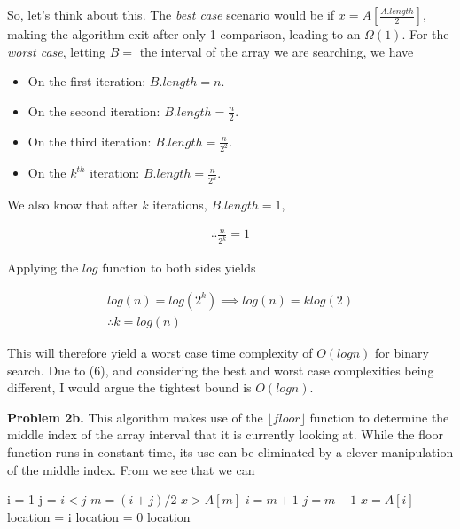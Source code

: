 \documentclass{article}
\begin{document}
So, let's think about this. The \emph{best case} scenario would be if $x = A[\frac{A.length}{2}]$, making the algorithm exit after only 1 comparison, leading to an $\Omega(1)$. For the \emph{worst case}, letting $B =$ the interval of the array we are searching, we have

\begin{itemize}
    \item On the first iteration: $B.length = n$.
    \item On the second iteration: $B.length = \frac{n}{2}$.
    \item On the third iteration: $B.length = \frac{n}{2^2}$.
    \item On the $k^{th}$ iteration: $B.length = \frac{n}{2^k}$.
\end{itemize}

We also know that after $k$ iterations, $B.length = 1$,

\begin{gather}
    \therefore \frac{n}{2^k} = 1
\end{gather}

Applying the $log$ function to both sides yields

\begin{gather}
    log(n) = log(2^k) \implies log(n) = klog(2) \\
    \therefore k = log(n)
\end{gather}

This will therefore yield a worst case time complexity of $O(logn)$ for binary search. Due to (6), and considering the best and worst case complexities being different, I would argue the tightest bound is $O(logn)$.

\hfill

\textbf{Problem 2b.} This algorithm makes use of the $\lfloor floor \rfloor$ function to determine the middle index of the array interval that it is currently looking at. While the floor function runs in constant time, its use can be eliminated by a clever manipulation of the middle index. From \cite{website:3} we see that we can

\begin{codebox}
    \li i = 1
    \li j = 
    \li \While $i < j$ \Do
    \li $m = (i + j)/2$
        \li \If $x > A[m]$
            \li \Then $i = m + 1$
            \li \Else $j = m - 1$
            \End
        \li \If $x = A[i]$
            \li \Then location = i
            \li \Else location = 0
            \End
        \End
    \li \Return location
\end{codebox}
\end{document}
